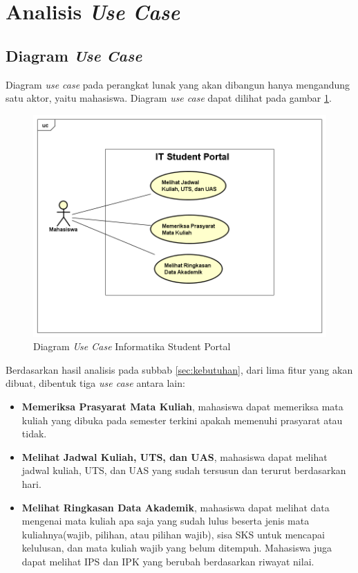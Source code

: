 \section{Analisis \textit{Use Case}}
\subsection{Diagram \textit{Use Case}}
Diagram \textit{use case} pada perangkat lunak yang akan dibangun hanya mengandung satu aktor, yaitu mahasiswa. Diagram \textit{use case} dapat dilihat pada gambar \ref{fig:3_usecase_diagram}. 
		\begin{figure}[H]
			\centering
			\includegraphics[scale=0.5]{Gambar/usecase-diagram}
			\caption{Diagram \textit{Use Case} Informatika Student Portal} 
			\label{fig:3_usecase_diagram}
		\end{figure}
Berdasarkan hasil analisis pada subbab \ref{sec:kebutuhan}, dari lima fitur yang akan dibuat, dibentuk tiga \textit{use case} antara lain:
\begin{itemize}
	\item \textbf{Memeriksa Prasyarat Mata Kuliah}, mahasiswa dapat memeriksa mata kuliah yang dibuka pada semester terkini apakah memenuhi prasyarat atau tidak. 
	\item \textbf{Melihat Jadwal Kuliah, UTS, dan UAS}, mahasiswa dapat melihat jadwal kuliah, UTS, dan UAS yang sudah tersusun dan terurut berdasarkan hari.
	\item \textbf{Melihat Ringkasan Data Akademik}, mahasiswa dapat melihat data mengenai mata kuliah apa saja yang sudah lulus beserta jenis mata kuliahnya(wajib, pilihan, atau pilihan wajib), sisa SKS untuk mencapai kelulusan, dan mata kuliah wajib yang belum ditempuh. Mahasiswa juga dapat melihat IPS dan IPK yang berubah berdasarkan riwayat nilai.
\end{itemize}

